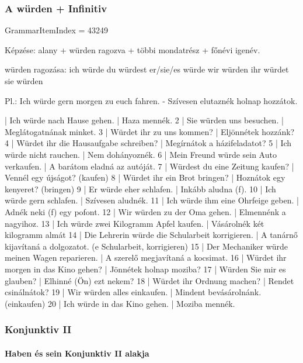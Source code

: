 \documentclass{article}
\newenvironment{desc}{\verbatim}{\endverbatim}
\newenvironment{exmp}{\verbatim}{\endverbatim}
\begin{document}
\subsubsection{A würden + Infinitiv}

GrammarItemIndex = 43249

\begin{desc}
Képzése: alany + würden ragozva + többi mondatrész + főnévi igenév.

würden ragozása:
ich würde
du würdest
er/sie/es würde
wir würden
ihr würdet
sie würden

Pl.: Ich würde gern morgen zu euch fahren. - Szívesen elutaznék holnap hozzátok.
\end{desc}

\begin{exmp}
1 | Ich würde nach Hause gehen. | Haza mennék.
2 | Sie würden uns besuchen. | Meglátogatnának minket.
3 | Würdet ihr zu uns kommen? | Eljönnétek hozzánk?
4 | Würdet ihr die Hausaufgabe schreiben? | Megírnátok a házifeladatot?
5 | Ich würde nicht rauchen. | Nem dohányoznék.
6 | Mein Freund würde sein Auto verkaufen. | A barátom eladná az autóját.
7 | Würdest du eine Zeitung kaufen? | Vennél egy újságot? (kaufen)
8 | Würdet ihr ein Brot bringen? | Hoznátok egy kenyeret? (bringen)
9 | Er würde eher schlafen. | Inkább aludna (f).
10 | Ich würde gern schlafen. | Szívesen aludnék.
11 | Ich würde ihm eine Ohrfeige geben. | Adnék neki (f) egy pofont.
12 | Wir würden zu der Oma gehen. | Elmennénk a nagyihoz.
13 | Ich würde zwei Kilogramm Apfel kaufen. | Vásárolnék két kilogramm almát
14 | Die Lehrerin würde die Schularbeit korrigieren. | A tanárnő kijavítaná a dolgozatot. (e Schularbeit, korrigieren)
15 | Der Mechaniker würde meinen Wagen reparieren. | A szerelő megjavítaná a kocsimat.
16 | Würdet ihr morgen in das Kino gehen? | Jönnétek holnap moziba?
17 | Würden Sie mir es glauben? | Elhinné (Ön) ezt nekem?
18 | Würdet ihr Ordnung machen? | Rendet csinálnátok?
19 | Wir würden alles einkaufen. | Mindent bevásárolnánk. (einkaufen)
20 | Ich würde in das Kino gehen. | Moziba mennék.
\end{exmp}

\subsubsection{Konjunktiv II}

\paragraph{Haben és sein Konjunktiv II alakja}
\end{document}
